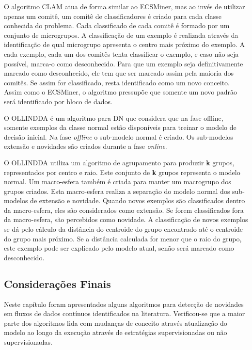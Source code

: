 \documentclass[qual, classic, a4paper]{ufbathesis}
\begin{document}
O algoritmo CLAM \cite{malkhateeb} atua de forma similar ao ECSMiner, mas ao invés de utilizar apenas um comitê, um comitê de classificadores é criado para cada classe conhecida do problema.
Cada classificado de cada comitê é formado por um conjunto de microgrupos. A classificação de um exemplo é realizada através da identificação de qual microgrupo apresenta o centro mais próximo do exemplo. A cada exemplo, cada um dos comitês tenta classificar o exemplo, e caso não seja possível, marca-o como desconhecido. Para que um exemplo seja definitivamente marcado como desconhecido, ele tem que ser marcado assim pela maioria dos comitês. Se assim for classificado, resta identificado como um novo conceito. Assim como o ECSMiner, o algoritmo pressupõe que somente um novo padrão será identificado por bloco de dados.

O OLLINDDA \cite{Spinosa:2009:NDA:1551768.1551770} é um algoritmo para DN
que considera que na fase offline, somente exemplos da classe normal estão disponíveis para treinar o modelo de decisão inicial.
Na fase \textit{offline} o sub-modelo normal é criado. Os sub-modelos extensão e novidades são criados durante a fase \textit{online}.

O OLLINDDA utiliza um algoritmo de agrupamento para produzir \textbf{k} grupos, representados por centro e raio. Este conjunto de \textbf{k} grupos representa o modelo normal. 
Um macro-esfera também é criada para manter um macrogrupo dos grupos criados. Esta macro-esfera realiza a separação do modelo normal dos sub-modelos de extensão e novidade. 
Quando novos exemplos são classificados dentro da macro-esfera, eles são considerados como extensão. Se forem classificados fora da macro-esfera, são percebidos como novidade. 
A classificação de novos exemplos se dá pelo cálculo da distância do centroide do grupo encontrado até o centroide do grupo mais próximo.
Se a distância calculada for menor que o raio do grupo, este exemplo pode ser explicado pelo modelo atual, senão será marcado como desconhecido.

\subsection{Considerações Finais}

Neste capítulo foram apresentados alguns algoritmos para detecção de novidades em fluxos de dados contínuos identificados na literatura. Verificou-se que a maior parte dos algoritmos lida com mudanças de conceito através atualização do modelo ao longo da execução através de estratégias supervisionadas ou não supervisionadas.
\end{document}
